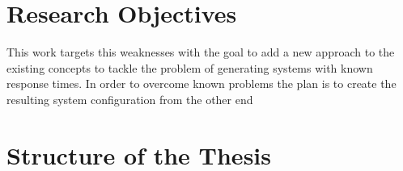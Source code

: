 \section{Research Objectives}\label{sec:research_objectives}
This work targets this weaknesses with the goal to add a new approach to the existing concepts to tackle the problem of generating systems with known response times.
In order to overcome known problems the plan is to create the resulting system configuration from the other end

\section{Structure of the Thesis}\label{sec:structure}

